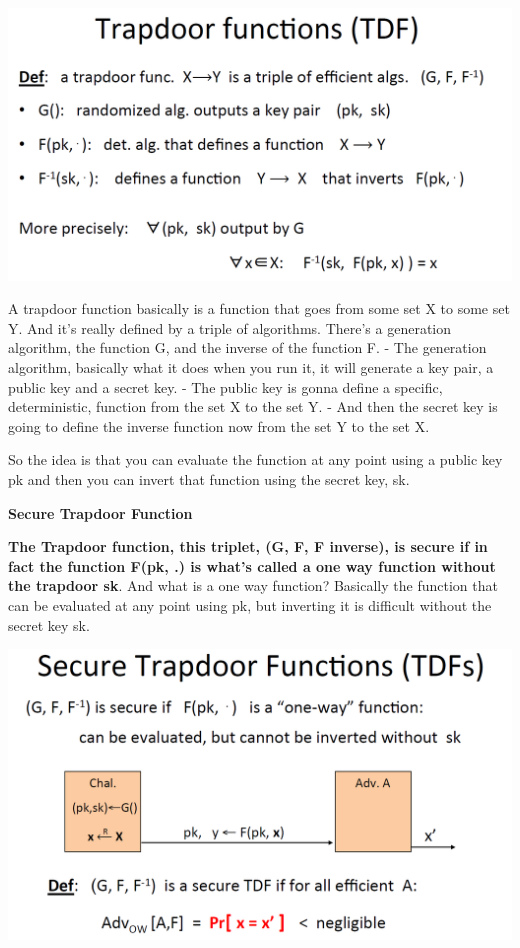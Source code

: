 \documentclass[11pt]{article}
\makeatletter
\def\maxwidth{\ifdim\Gin@nat@width>\linewidth\linewidth
    \else\Gin@nat@width\fi}
\let\Oldincludegraphics\includegraphics
\renewcommand{\includegraphics}[1]{\Oldincludegraphics[width=.8\maxwidth]{#1}}
\makeatother
\begin{document}
\includegraphics{./Images/PKEnc-TDF.png}

A trapdoor function basically is a function that goes from some set X to
some set Y. And it's really defined by a triple of algorithms. There's a
generation algorithm, the function G, and the inverse of the function F.
- The generation algorithm, basically what it does when you run it, it
will generate a key pair, a public key and a secret key. - The public
key is gonna define a specific, deterministic, function from the set X
to the set Y. - And then the secret key is going to define the inverse
function now from the set Y to the set X.

So the idea is that you can evaluate the function at any point using a
public key pk and then you can invert that function using the secret
key, sk.

\textbf{Secure Trapdoor Function}

\textbf{The Trapdoor function, this triplet, (G, F, F inverse), is
secure if in fact the function F(pk, .) is what's called a one way
function without the trapdoor sk}. And what is a one way function?
Basically the function that can be evaluated at any point using pk, but
inverting it is difficult without the secret key sk.

\includegraphics{./Images/PKEnc-SecureTDF.png}
\end{document}
